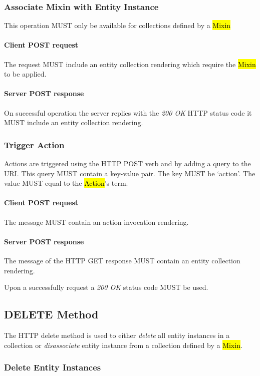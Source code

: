 \documentclass[10pt,a4paper]{article}
\begin{document}
\subsubsection{Associate Mixin with Entity Instance}
This operation MUST only be available for collections defined by a \hl{Mixin}

\paragraph{Client POST request}
The request MUST include an entity collection rendering which require the \hl{Mixin} to be applied.

\paragraph{Server POST response}
On successful operation the server replies with the \emph{200 OK} HTTP status code it MUST include an entity collection rendering.

\subsubsection{Trigger Action}
Actions are triggered using the HTTP POST verb and by adding a query to the URI. This query MUST contain a key-value pair. The key MUST be `action'. The value MUST equal to the \hl{Action}'s term.

\paragraph{Client POST request}
The message MUST contain an action invocation rendering.

\paragraph{Server POST response}
The message of the HTTP GET response MUST contain an entity collection rendering.

Upon a successfully request a \emph{200 OK} status code MUST be used.

\subsection{DELETE Method}
The HTTP delete method is used to either {\em delete} all entity instances in a collection or {\em disassociate} entity instance from a collection defined by a \hl{Mixin}.

\subsubsection{Delete Entity Instances}
\end{document}

